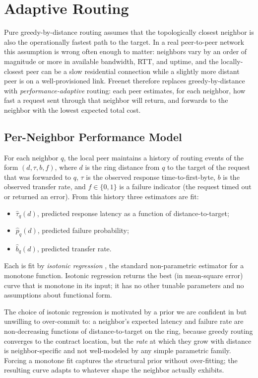 \section{Adaptive Routing}
\label{sec:adaptive}

Pure greedy-by-distance routing assumes that the topologically closest neighbor is also the operationally fastest path to the target. In a real peer-to-peer network this assumption is wrong often enough to matter: neighbors vary by an order of magnitude or more in available bandwidth, RTT, and uptime, and the locally-closest peer can be a slow residential connection while a slightly more distant peer is on a well-provisioned link. Freenet therefore replaces greedy-by-distance with \emph{performance-adaptive} routing: each peer estimates, for each neighbor, how fast a request sent through that neighbor will return, and forwards to the neighbor with the lowest expected total cost.

\subsection{Per-Neighbor Performance Model}

For each neighbor $q$, the local peer maintains a history of routing events of the form $(d, \tau, b, f)$, where $d$ is the ring distance from $q$ to the target of the request that was forwarded to $q$, $\tau$ is the observed response time-to-first-byte, $b$ is the observed transfer rate, and $f \in \{0, 1\}$ is a failure indicator (the request timed out or returned an error). From this history three estimators are fit:

\begin{itemize}[leftmargin=*, itemsep=2pt]
  \item $\widehat{\tau}_q(d)$, predicted response latency as a function of distance-to-target;
  \item $\widehat{p}_q(d)$, predicted failure probability;
  \item $\widehat{b}_q(d)$, predicted transfer rate.
\end{itemize}

Each is fit by \emph{isotonic regression} \citep{barlow1972statistical, deleeuw2009isotone}, the standard non-parametric estimator for a monotone function. Isotonic regression returns the best (in mean-square error) curve that is monotone in its input; it has no other tunable parameters and no assumptions about functional form.

The choice of isotonic regression is motivated by a prior we are confident in but unwilling to over-commit to: a neighbor's expected latency and failure rate are non-decreasing functions of distance-to-target on the ring, because greedy routing converges to the contract location, but the \emph{rate} at which they grow with distance is neighbor-specific and not well-modeled by any simple parametric family. Forcing a monotone fit captures the structural prior without over-fitting; the resulting curve adapts to whatever shape the neighbor actually exhibits.

